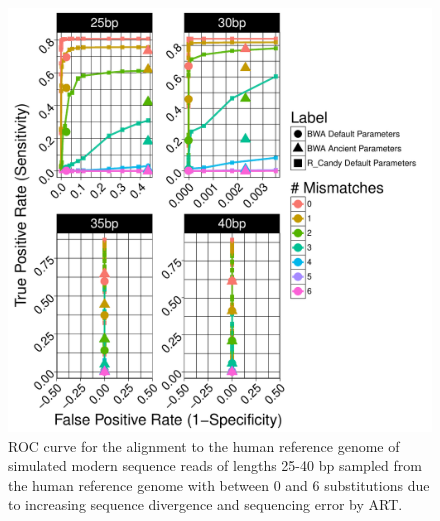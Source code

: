 \documentclass[11pt,a4paper]{report}
\begin{document}
\begin{figure}[H]
\centering
\includegraphics[width=12cm]{pictures/f_DS6_ART.pdf}
\caption{
ROC curve for the alignment to the human reference genome of simulated modern 
sequence reads of lengths 25-40 bp sampled from the human reference genome with 
between 0 and 6 substitutions due to increasing sequence divergence and sequencing error by ART.
}
\label{DS6_ART}
\end{figure}
\end{document}
